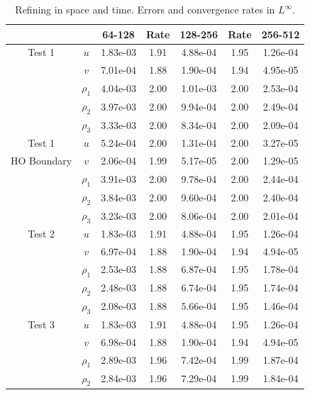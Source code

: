 \documentclass[final]{siamltex}
\begin{document}
\begin{table}[h]
\begin{center}
\caption{Refining in space and time.  Errors and convergence rates in $L^\infty$.}
\label{tab:Linf}
\begin{tabular}{ccccccc}
& & 64-128 & Rate & 128-256 & Rate & 256-512 \\
\hline
Test 1              & $u$      & 1.83e-03 & 1.91 & 4.88e-04 & 1.95 & 1.26e-04 \\
                    & $v$      & 7.01e-04 & 1.88 & 1.90e-04 & 1.94 & 4.95e-05 \\
                    & $\rho_1$ & 4.04e-03 & 2.00 & 1.01e-03 & 2.00 & 2.53e-04 \\
                    & $\rho_2$ & 3.97e-03 & 2.00 & 9.94e-04 & 2.00 & 2.49e-04 \\
                    & $\rho_3$ & 3.33e-03 & 2.00 & 8.34e-04 & 2.00 & 2.09e-04 \\
\hline
Test 1              & $u$      & 5.24e-04 & 2.00 & 1.31e-04 & 2.00 & 3.27e-05 \\
HO Boundary         & $v$      & 2.06e-04 & 1.99 & 5.17e-05 & 2.00 & 1.29e-05 \\
                    & $\rho_1$ & 3.91e-03 & 2.00 & 9.78e-04 & 2.00 & 2.44e-04 \\
                    & $\rho_2$ & 3.84e-03 & 2.00 & 9.60e-04 & 2.00 & 2.40e-04 \\
                    & $\rho_3$ & 3.23e-03 & 2.00 & 8.06e-04 & 2.00 & 2.01e-04 \\
\hline
Test 2              & $u$      & 1.83e-03 & 1.91 & 4.88e-04 & 1.95 & 1.26e-04 \\
                    & $v$      & 6.97e-04 & 1.88 & 1.90e-04 & 1.94 & 4.94e-05 \\
                    & $\rho_1$ & 2.53e-03 & 1.88 & 6.87e-04 & 1.95 & 1.78e-04 \\
                    & $\rho_2$ & 2.48e-03 & 1.88 & 6.74e-04 & 1.95 & 1.74e-04 \\
                    & $\rho_3$ & 2.08e-03 & 1.88 & 5.66e-04 & 1.95 & 1.46e-04 \\
\hline
Test 3              & $u$      & 1.83e-03 & 1.91 & 4.88e-04 & 1.95 & 1.26e-04 \\
                    & $v$      & 6.98e-04 & 1.88 & 1.90e-04 & 1.94 & 4.94e-05 \\
                    & $\rho_1$ & 2.89e-03 & 1.96 & 7.42e-04 & 1.99 & 1.87e-04 \\
                    & $\rho_2$ & 2.84e-03 & 1.96 & 7.29e-04 & 1.99 & 1.84e-04 \\

\end{tabular}
\end{center}
\end{table}
\end{document}
